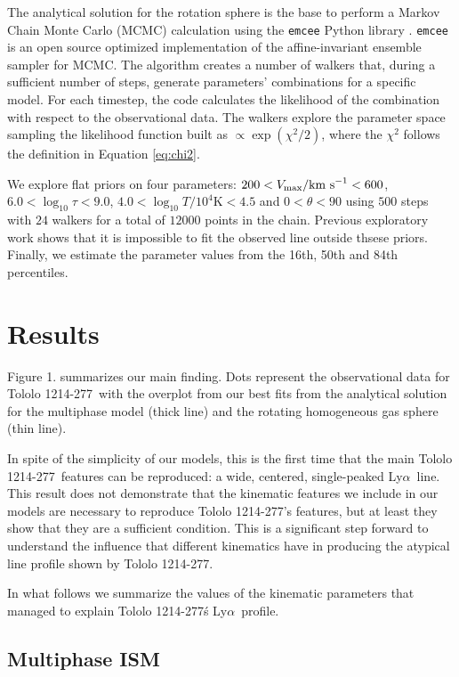 \documentclass[a4,useAMS,usenatbib,usegraphicx]{mn2e}
\newcommand{\tol}{Tololo 1214-277}
\newcommand{\lya}{Ly$\alpha$}
\begin{document}
The analytical solution for the rotation sphere is the base to
perform a Markov Chain Monte Carlo (MCMC) calculation using the
\texttt{emcee} Python library \citep{2013PASP..125..306F}. \texttt{emcee} 
is an open source optimized implementation of the affine-invariant 
ensemble sampler for MCMC. 
The algorithm creates a number of walkers that,
during a sufficient number of steps, generate parameters' combinations
for a specific model.
For each timestep, the code calculates the likelihood of the
combination with respect to the observational data.
The walkers explore
the parameter space sampling the likelihood function built as $\propto
\exp(\chi^2/2)$, where the $\chi^2$ follows the definition in Equation
\ref{eq:chi2}. 


We explore flat priors on four parameters: $200<V_{\rm
  max}/\mathrm{km\ s}^{-1} <600$,   $6.0<\log_{10}\tau<9.0$,
$4.0<\log_{10} T/10^4\mathrm{K}< 4.5$ and $0<\theta<90$ using $500$
steps with $24$ walkers for a total of $12000$ points in the chain.
Previous exploratory work shows that it is impossible to fit the
observed line outside thsese priors.
Finally, we estimate the parameter values from the 16th, 50th and 84th
percentiles. 


\section{Results}


Figure 1. summarizes our main finding.
Dots represent the observational data for \tol\ with the
overplot from our best fits from the analytical solution for the
multiphase model (thick line)  and the rotating homogeneous gas sphere
(thin line). 

In spite of the simplicity of our models, this is the first time that
the main \tol\ features can be reproduced: a wide, centered,
single-peaked \lya\ line.
This result does not demonstrate that the kinematic features we
include in our models are necessary to reproduce \tol's features, but
at least they show that they are a sufficient condition.
This is a significant step forward to understand the influence that
different kinematics have in producing the atypical line profile shown
by \tol.

In what follows we summarize the values of the kinematic parameters
that managed to explain \tol\'s \lya\ profile.


\subsection{Multiphase ISM}
\end{document}
